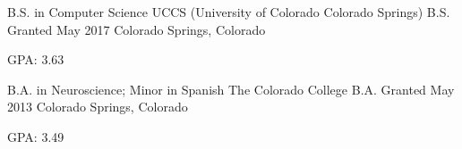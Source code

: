

\begin{cventries}

  \cventry
    {B.S. in Computer Science} %
    {UCCS (University of Colorado Colorado Springs)} %
    {B.S. Granted May 2017} %
    {Colorado Springs, Colorado} %
    {
      \begin{cvitems} %
        \item {GPA: 3.63}
      \end{cvitems}
    }
    
  \cventry
    {B.A. in Neuroscience; Minor in Spanish} %
    {The Colorado College} %
    {B.A. Granted May 2013} %
    {Colorado Springs, Colorado} %
    {
      \begin{cvitems} %
       \item {GPA: 3.49}
      \end{cvitems}
    }

\end{cventries}
